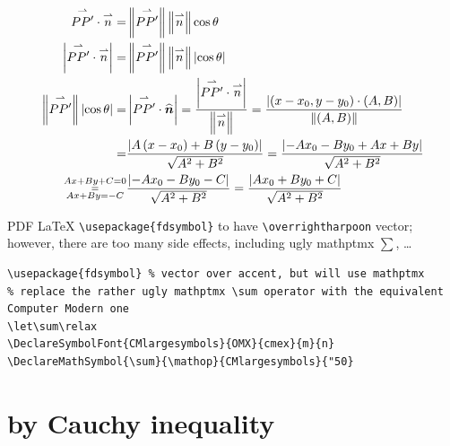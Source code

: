 \documentclass[
]{book}
\theoremstyle{definition}
\theoremstyle{definition}
\theoremstyle{definition}
\theoremstyle{definition}
\theoremstyle{remark}
\begin{document}
\[
\begin{aligned}
\overset{\rightharpoonup}{PP^{\prime}}\cdot\overset{\rightharpoonup}{n}= & \left\Vert \overset{\rightharpoonup}{PP^{\prime}}\right\Vert \left\Vert \overset{\rightharpoonup}{n}\right\Vert \cos\theta\\
\left|\overset{\rightharpoonup}{PP^{\prime}}\cdot\overset{\rightharpoonup}{n}\right|= & \left\Vert \overset{\rightharpoonup}{PP^{\prime}}\right\Vert \left\Vert \overset{\rightharpoonup}{n}\right\Vert \left|\cos\theta\right|\\
\left\Vert \overset{\rightharpoonup}{PP^{\prime}}\right\Vert \left|\cos\theta\right|= & \left|\overset{\rightharpoonup}{PP^{\prime}}\cdot\widehat{\boldsymbol{n}}\right|=\dfrac{\left|\overset{\rightharpoonup}{PP^{\prime}}\cdot\overset{\rightharpoonup}{n}\right|}{\left\Vert \overset{\rightharpoonup}{n}\right\Vert }=\dfrac{\left|\left(x-x_{0},y-y_{0}\right)\cdot\left(A,B\right)\right|}{\left\Vert \left(A,B\right)\right\Vert }\\
= & \dfrac{\left|A\left(x-x_{0}\right)+B\left(y-y_{0}\right)\right|}{\sqrt{A^{2}+B^{2}}}=\dfrac{\left|-Ax_{0}-By_{0}+Ax+By\right|}{\sqrt{A^{2}+B^{2}}}\\
\begin{subarray}{c}
Ax+By+C=0\\
=\\
Ax+By=-C
\end{subarray} & \dfrac{\left|-Ax_{0}-By_{0}-C\right|}{\sqrt{A^{2}+B^{2}}}=\dfrac{\left|Ax_{0}+By_{0}+C\right|}{\sqrt{A^{2}+B^{2}}}
\end{aligned}
\]

PDF LaTeX \texttt{\textbackslash{}usepackage\{fdsymbol\}} to have \texttt{\textbackslash{}overrightharpoon} vector; however, there are too many side effects, including ugly mathptmx \(\sum\), \ldots{}

\begin{verbatim}
\usepackage{fdsymbol} % vector over accent, but will use mathptmx
% replace the rather ugly mathptmx \sum operator with the equivalent Computer Modern one
\let\sum\relax
\DeclareSymbolFont{CMlargesymbols}{OMX}{cmex}{m}{n}
\DeclareMathSymbol{\sum}{\mathop}{CMlargesymbols}{"50}
\end{verbatim}

\hypertarget{by-cauchy-inequality}{%
\section{by Cauchy inequality}\label{by-cauchy-inequality}}
\end{document}
